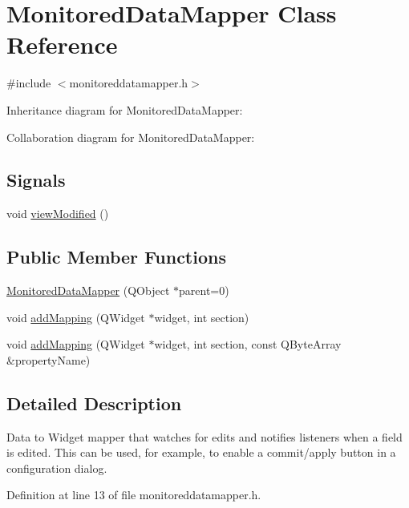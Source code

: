 \hypertarget{class_monitored_data_mapper}{}\section{Monitored\+Data\+Mapper Class Reference}
\label{class_monitored_data_mapper}


{\ttfamily \#include $<$monitoreddatamapper.\+h$>$}



Inheritance diagram for Monitored\+Data\+Mapper\+:


Collaboration diagram for Monitored\+Data\+Mapper\+:
\subsection*{Signals}
\begin{DoxyCompactItemize}
\item 
void \hyperlink{class_monitored_data_mapper_af1088f1181f9c77eb7d1d4be41a80ca8}{view\+Modified} ()
\end{DoxyCompactItemize}
\subsection*{Public Member Functions}
\begin{DoxyCompactItemize}
\item 
\hyperlink{class_monitored_data_mapper_a421f36fe4f05caf4345986a1a31aa258}{Monitored\+Data\+Mapper} (Q\+Object $\ast$parent=0)
\item 
void \hyperlink{class_monitored_data_mapper_a5ddfc6ef4e955211948c7b24994dfd7e}{add\+Mapping} (Q\+Widget $\ast$widget, int section)
\item 
void \hyperlink{class_monitored_data_mapper_af70ac6e3d3b891cadb8a4c4b8695d4cc}{add\+Mapping} (Q\+Widget $\ast$widget, int section, const Q\+Byte\+Array \&property\+Name)
\end{DoxyCompactItemize}


\subsection{Detailed Description}
Data to Widget mapper that watches for edits and notifies listeners when a field is edited. This can be used, for example, to enable a commit/apply button in a configuration dialog. 

Definition at line 13 of file monitoreddatamapper.\+h.



